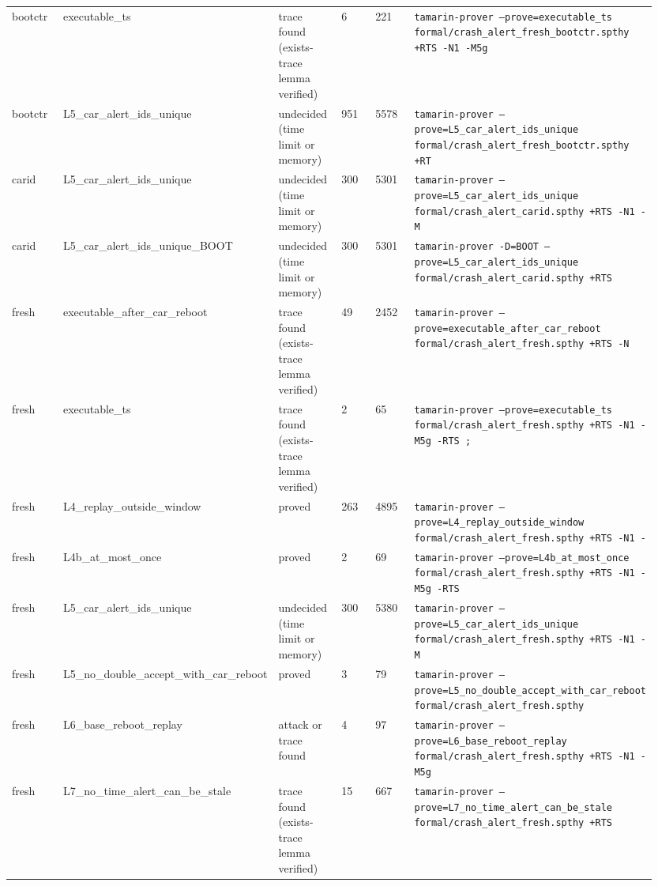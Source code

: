 {\begin{longtable}{p{0.158\linewidth}p{0.158\linewidth}p{0.158\linewidth}p{0.158\linewidth}p{0.158\linewidth}p{0.158\linewidth}}
bootctr & executable\_ts & trace found (exists-trace lemma verified) & 6 & 221 & \texttt{tamarin-prover  --prove=executable\_ts formal/crash\_alert\_fresh\_bootctr.spthy +RTS -N1 -M5g} \\
bootctr & L5\_car\_alert\_ids\_unique & undecided (time limit or memory) & 951 & 5578 & \texttt{tamarin-prover  --prove=L5\_car\_alert\_ids\_unique formal/crash\_alert\_fresh\_bootctr.spthy +RT} \\
carid & L5\_car\_alert\_ids\_unique & undecided (time limit or memory) & 300 & 5301 & \texttt{tamarin-prover  --prove=L5\_car\_alert\_ids\_unique formal/crash\_alert\_carid.spthy +RTS -N1 -M} \\
carid & L5\_car\_alert\_ids\_unique\_BOOT & undecided (time limit or memory) & 300 & 5301 & \texttt{tamarin-prover -D=BOOT --prove=L5\_car\_alert\_ids\_unique formal/crash\_alert\_carid.spthy +RTS} \\
fresh & executable\_after\_car\_reboot & trace found (exists-trace lemma verified) & 49 & 2452 & \texttt{tamarin-prover  --prove=executable\_after\_car\_reboot formal/crash\_alert\_fresh.spthy +RTS -N} \\
fresh & executable\_ts & trace found (exists-trace lemma verified) & 2 & 65 & \texttt{tamarin-prover  --prove=executable\_ts formal/crash\_alert\_fresh.spthy +RTS -N1 -M5g -RTS ; } \\
fresh & L4\_replay\_outside\_window & proved & 263 & 4895 & \texttt{tamarin-prover  --prove=L4\_replay\_outside\_window formal/crash\_alert\_fresh.spthy +RTS -N1 -} \\
fresh & L4b\_at\_most\_once & proved & 2 & 69 & \texttt{tamarin-prover  --prove=L4b\_at\_most\_once formal/crash\_alert\_fresh.spthy +RTS -N1 -M5g -RTS} \\
fresh & L5\_car\_alert\_ids\_unique & undecided (time limit or memory) & 300 & 5380 & \texttt{tamarin-prover  --prove=L5\_car\_alert\_ids\_unique formal/crash\_alert\_fresh.spthy +RTS -N1 -M} \\
fresh & L5\_no\_double\_accept\_with\_car\_reboot & proved & 3 & 79 & \texttt{tamarin-prover  --prove=L5\_no\_double\_accept\_with\_car\_reboot formal/crash\_alert\_fresh.spthy} \\
fresh & L6\_base\_reboot\_replay & attack or trace found & 4 & 97 & \texttt{tamarin-prover  --prove=L6\_base\_reboot\_replay formal/crash\_alert\_fresh.spthy +RTS -N1 -M5g} \\
fresh & L7\_no\_time\_alert\_can\_be\_stale & trace found (exists-trace lemma verified) & 15 & 667 & \texttt{tamarin-prover  --prove=L7\_no\_time\_alert\_can\_be\_stale formal/crash\_alert\_fresh.spthy +RTS } \\

\end{longtable}}
